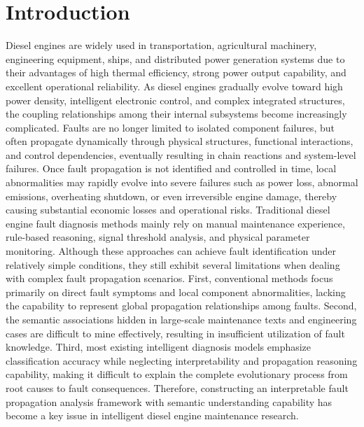 \documentclass[
aps,%
12pt,%
final,%
notitlepage,%
oneside,%
onecolumn,%
nobibnotes,%
nofootinbib,%
superscriptaddress,%
noshowpacs,%
centertags]%
{revtex4}
\begin{document}
\section{Introduction}
Diesel engines are widely used in transportation, agricultural machinery, engineering equipment, ships, and distributed power generation systems due to their advantages of high thermal efficiency, strong power output capability, and excellent operational reliability\cite{mollenhauer2010handbook}. As diesel engines gradually evolve toward high power density, intelligent electronic control, and complex integrated structures, the coupling relationships among their internal subsystems become increasingly complicated. Faults are no longer limited to isolated component failures, but often propagate dynamically through physical structures, functional interactions, and control dependencies, eventually resulting in chain reactions and system-level failures\cite{gao2008fault}. Once fault propagation is not identified and controlled in time, local abnormalities may rapidly evolve into severe failures such as power loss, abnormal emissions, overheating shutdown, or even irreversible engine damage, thereby causing substantial economic losses and operational risks.
Traditional diesel engine fault diagnosis methods mainly rely on manual maintenance experience, rule-based reasoning, signal threshold analysis, and physical parameter monitoring\cite{peng2012application}. Although these approaches can achieve fault identification under relatively simple conditions, they still exhibit several limitations when dealing with complex fault propagation scenarios\cite{zheng2020fault}. First, conventional methods focus primarily on direct fault symptoms and local component abnormalities, lacking the capability to represent global propagation relationships among faults. Second, the semantic associations hidden in large-scale maintenance texts and engineering cases are difficult to mine effectively, resulting in insufficient utilization of fault knowledge\cite{naryanto2023diesel}. Third, most existing intelligent diagnosis models emphasize classification accuracy while neglecting interpretability and propagation reasoning capability, making it difficult to explain the complete evolutionary process from root causes to fault consequences. Therefore, constructing an interpretable fault propagation analysis framework with semantic understanding capability has become a key issue in intelligent diesel engine maintenance research.
\end{document}
